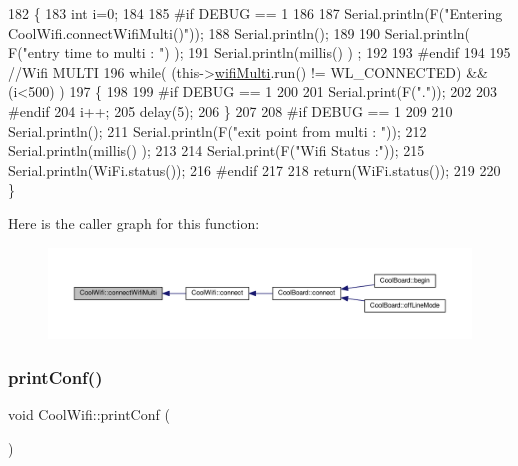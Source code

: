 \begin{DoxyCode}
182 \{
183     \textcolor{keywordtype}{int} i=0;
184 
185 \textcolor{preprocessor}{#if DEBUG == 1 }
186 
187     Serial.println(F(\textcolor{stringliteral}{"Entering CoolWifi.connectWifiMulti()"}));
188     Serial.println();
189     
190     Serial.println( F(\textcolor{stringliteral}{"entry time to multi : "}) );
191     Serial.println(millis() ) ;
192 
193 \textcolor{preprocessor}{#endif}
194     
195     \textcolor{comment}{//Wifi MULTI}
196     \textcolor{keywordflow}{while}( (this->\hyperlink{class_cool_wifi_a7862a8c0d7239877e2956c14a368aab8}{wifiMulti}.run() != WL\_CONNECTED) && (i<500)  ) 
197     \{
198 
199 \textcolor{preprocessor}{    #if DEBUG == 1}
200 
201         Serial.print(F(\textcolor{stringliteral}{"."}));
202         
203 \textcolor{preprocessor}{    #endif}
204         i++;
205         delay(5);
206         \}   
207 
208 \textcolor{preprocessor}{#if DEBUG == 1 }
209 
210     Serial.println();   
211     Serial.println(F(\textcolor{stringliteral}{"exit point from multi : "}));
212     Serial.println(millis() );
213     
214     Serial.print(F(\textcolor{stringliteral}{"Wifi Status :"}));
215     Serial.println(WiFi.status());
216 \textcolor{preprocessor}{#endif}
217 
218     \textcolor{keywordflow}{return}(WiFi.status());
219 
220 \}
\end{DoxyCode}
Here is the caller graph for this function\+:\nopagebreak
\begin{figure}[H]
\begin{center}
\leavevmode
\includegraphics[width=350pt]{d7/d29/class_cool_wifi_a419de92d738f14b7444cf822b3ab0070_icgraph}
\end{center}
\end{figure}
\mbox{\label{class_cool_wifi_a9e6105c6d13d35ec510f6633da9e0223}} 
\subsubsection{\texorpdfstring{print\+Conf()}{printConf()}}
{\footnotesize\ttfamily void Cool\+Wifi\+::print\+Conf (\begin{DoxyParamCaption}{ }\end{DoxyParamCaption})}

